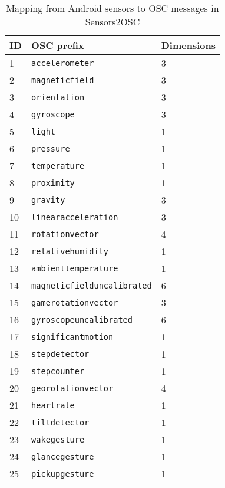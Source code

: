 \begin{table}[t]
	\centering
	\caption{Mapping from Android sensors to OSC messages in Sensors2OSC}
	\label{tab:mapping}
	\begin{tabular}{|l|l|l|}  \hline
		ID & OSC prefix                  & Dimensions \\   \hline
		1  & \lstinline$accelerometer$             & 3          \\
		2  & \lstinline$magneticfield$             & 3          \\
		3  & \lstinline$orientation$              & 3          \\
		4  & \lstinline$gyroscope$                 & 3          \\
		5  & \lstinline$light$                      & 1          \\
		6  & \lstinline$pressure$                   & 1          \\
		7  & \lstinline$temperature$                & 1          \\
		8  & \lstinline$proximity$                  & 1          \\
		9  & \lstinline$gravity$                   & 3          \\
		10 & \lstinline$linearacceleration$        & 3          \\
		11 & \lstinline$rotationvector$            & 4          \\
		12 & \lstinline$relativehumidity$           & 1          \\
		13 & \lstinline$ambienttemperature$         & 1          \\
		14 & \lstinline$magneticfielduncalibrated$  & 6          \\
		15 & \lstinline$gamerotationvector$        & 3          \\
		16 & \lstinline$gyroscopeuncalibrated$     & 6          \\
		17 & \lstinline$significantmotion$          & 1          \\
		18 & \lstinline$stepdetector$               & 1          \\
		19 & \lstinline$stepcounter$                & 1          \\
		20 & \lstinline$georotationvector$         & 4          \\
		21 & \lstinline$heartrate$                  & 1         \\ 
		22 & \lstinline$tiltdetector$               & 1      \\
		23 & \lstinline$wakegesture$             & 1      \\
		24 & \lstinline$glancegesture$           & 1      \\
		25 & \lstinline$pickupgesture$           & 1     \\ \hline
	\end{tabular}
\end{table}

